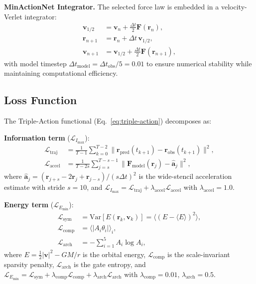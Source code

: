 \documentclass[9pt,twocolumn,twoside]{pnas-new}
\begin{document}
\textbf{MinActionNet Integrator.} The selected force law is embedded in a velocity-Verlet integrator:
\begin{align}
\mathbf{v}_{1/2} &= \mathbf{v}_n + \tfrac{\Delta t}{2} \mathbf{F}(\mathbf{r}_n), \nonumber \\
\mathbf{r}_{n+1} &= \mathbf{r}_n + \Delta t \, \mathbf{v}_{1/2}, \\
\mathbf{v}_{n+1} &= \mathbf{v}_{1/2} + \tfrac{\Delta t}{2} \mathbf{F}(\mathbf{r}_{n+1}), \nonumber
\end{align}
with model timestep $\Delta t_{\text{model}} = \Delta t_{\text{obs}} / 5 = 0.01$ to ensure numerical stability while maintaining computational efficiency.

\subsection*{Loss Function}
The Triple-Action functional (Eq.~\ref{eq:triple-action}) decomposes as:

\textbf{Information term} ($\mathcal{L}_{I_{\max}}$):
\begin{align}
\mathcal{L}_{\text{traj}} &= \frac{1}{T-1} \sum_{k=0}^{T-2} \|\mathbf{r}_{\text{pred}}(t_{k+1}) - \mathbf{r}_{\text{obs}}(t_{k+1})\|^2, \\
\mathcal{L}_{\text{accel}} &= \frac{1}{T-2s} \sum_{j=s}^{T-s-1} \|\mathbf{F}_{\text{model}}(\mathbf{r}_j) - \hat{\mathbf{a}}_j\|^2,
\end{align}
where $\hat{\mathbf{a}}_j = (\mathbf{r}_{j+s} - 2\mathbf{r}_j + \mathbf{r}_{j-s}) / (s \Delta t)^2$ is the wide-stencil acceleration estimate with stride $s=10$, and $\mathcal{L}_{I_{\max}} = \mathcal{L}_{\text{traj}} + \lambda_{\text{accel}} \mathcal{L}_{\text{accel}}$ with $\lambda_{\text{accel}} = 1.0$.

\textbf{Energy term} ($\mathcal{L}_{E_{\min}}$):
\begin{align}
\mathcal{L}_{\text{sym}} &= \text{Var}[E(\mathbf{r}_k, \mathbf{v}_k)] = \langle (E - \langle E \rangle)^2 \rangle, \\
\mathcal{L}_{\text{comp}} &= \langle |A_i \theta_i| \rangle_i, \\
\mathcal{L}_{\text{arch}} &= -\sum_{i=1}^5 A_i \log A_i,
\end{align}
where $E = \tfrac{1}{2}|\mathbf{v}|^2 - GM/r$ is the orbital energy, $\mathcal{L}_{\text{comp}}$ is the scale-invariant sparsity penalty, $\mathcal{L}_{\text{arch}}$ is the gate entropy, and $\mathcal{L}_{E_{\min}} = \mathcal{L}_{\text{sym}} + \lambda_{\text{comp}} \mathcal{L}_{\text{comp}} + \lambda_{\text{arch}} \mathcal{L}_{\text{arch}}$ with $\lambda_{\text{comp}} = 0.01$, $\lambda_{\text{arch}} = 0.5$.
\end{document}
